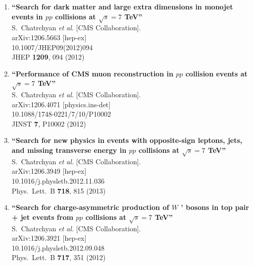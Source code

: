 \documentclass{article}
\begin{document}
\begin{enumerate}
\item%
{\bf ``Search for dark matter and large extra dimensions in monojet events in $pp$ collisions at $\sqrt{s}=7$ TeV''}
  \\{}S.~Chatrchyan {\it et al.}  [CMS Collaboration].
  \\{}arXiv:1206.5663 [hep-ex]
    \\{}10.1007/JHEP09(2012)094
\\{}JHEP {\bf 1209}, 094 (2012) %


\item%
{\bf ``Performance of CMS muon reconstruction in $pp$ collision events at $\sqrt{s}=7$ TeV''}
  \\{}S.~Chatrchyan {\it et al.}  [CMS Collaboration].
  \\{}arXiv:1206.4071 [physics.ins-det]
    \\{}10.1088/1748-0221/7/10/P10002
\\{}JINST {\bf 7}, P10002 (2012) %


\item%
{\bf ``Search for new physics in events with opposite-sign leptons, jets, and missing transverse energy in $pp$ collisions at $\sqrt{s}=7$ TeV''}
  \\{}S.~Chatrchyan {\it et al.}  [CMS Collaboration].
  \\{}arXiv:1206.3949 [hep-ex]
    \\{}10.1016/j.physletb.2012.11.036
\\{}Phys.\ Lett.\ B {\bf 718}, 815 (2013) %


\item%
{\bf ``Search for charge-asymmetric production of $W$ ' bosons in top pair + jet events from $pp$ collisions at $\sqrt{s}=7$ TeV''}
  \\{}S.~Chatrchyan {\it et al.}  [CMS Collaboration].
  \\{}arXiv:1206.3921 [hep-ex]
    \\{}10.1016/j.physletb.2012.09.048
\\{}Phys.\ Lett.\ B {\bf 717}, 351 (2012) %



\end{enumerate}
\end{document}
